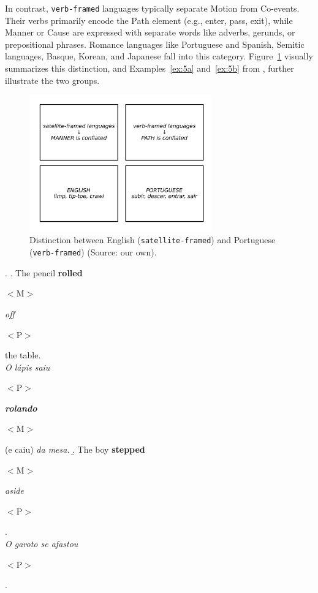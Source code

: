 {{In contrast, \texttt{verb-framed} languages typically separate Motion from Co-events. Their verbs primarily encode the Path element (e.g., enter, pass, exit), while Manner or Cause are expressed with separate words like adverbs, gerunds, or prepositional phrases. Romance languages like Portuguese and Spanish, Semitic languages, Basque, Korean, and Japanese fall into this category. Figure~\ref{fig:s-v-distinction} visually summarizes this distinction, and Examples~\ref{ex:5a} and~\ref{ex:5b} from \textcite{oliveira2022expressing}, further illustrate the two groups.

\begin{figure}[htb]
\centering
\includegraphics[width=0.7\textwidth]{figuras/Unknown-4.png}
\caption{\label{fig:s-v-distinction} Distinction between English (\texttt{satellite-framed}) and Portuguese (\texttt{verb-framed}) (Source: our own).}
\end{figure}

\ex. 
    \a. The pencil \textbf{rolled}\begin{scriptsize}$<$M$>$\end{scriptsize} \textit{off}\begin{scriptsize}$<$P$>$\end{scriptsize} the table. \\
    \emph{O lápis \textit{saiu}}\begin{scriptsize}$<$P$>$\end{scriptsize} \textbf{\emph{rolando}}\begin{scriptsize}$<$M$>$\end{scriptsize} (e caiu) \emph{da mesa}. \label{ex:5a} 
    \b. The boy \textbf{stepped}\begin{scriptsize}$<$M$>$\end{scriptsize} \emph{aside}\begin{scriptsize}$<$P$>$\end{scriptsize}. \\
    \emph{O garoto se \textit{afastou}}\begin{scriptsize}$<$P$>$\end{scriptsize}. \label{ex:5b}

}}

